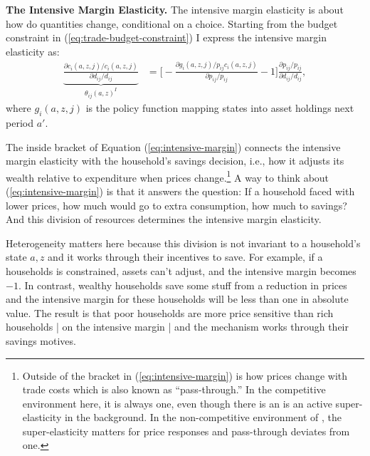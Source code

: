 \documentclass[12pt,pdftex]{article}
\begin{document}
\begin{onehalfspacing}
\textbf{The Intensive Margin Elasticity.} The intensive margin elasticity is about how do quantities change, conditional on a choice. Starting from the budget constraint in (\ref{eq:trade-budget-constraint}) I express the intensive margin elasticity as:
\begin{align}
\underbrace{\frac{\partial c_{i}(a,z,j)/ c_{i}(a,z,j)}{\partial d_{ij} / d_{ij}}}_{\theta_{ij}(a,z)^{I}} &= \bigg [-\frac{\partial g_{i}(a,z,j)/ p_{ij}c_{i}(a,z,j)}{\partial p_{ij}/ p_{ij}} - 1 \bigg ]\frac{\partial p_{ij}/p_{ij}}{\partial d_{ij}/ d_{ij}} ,
\label{eq:intensive-margin}
\end{align}
where $g_{i}(a,z,j)$ is the policy function mapping states into asset holdings next period $a'$.

The inside bracket of Equation (\ref{eq:intensive-margin}) connects the intensive margin elasticity with the household's savings decision, i.e., how it adjusts its wealth relative to expenditure when prices change.\footnote{Outside of the bracket in (\ref{eq:intensive-margin}) is how prices change with trade costs which is also known as ``pass-through.'' In the competitive environment here, it is always one, even though there is an is an active super-elasticity in the background. In the non-competitive environment of \citet{p-iq}, the super-elasticity matters for price responses and pass-through deviates from one.} A way to think about (\ref{eq:intensive-margin}) is that it answers the question: If a household faced with lower prices, how much would go to extra consumption, how much to savings? And this division of resources determines the intensive margin elasticity.

Heterogeneity matters here because this division is not invariant to a household's state $a, z$ and it works through their incentives to save. For example, if a households is constrained, assets can't adjust, and the intensive margin becomes $-1$. In contrast, wealthy households save some stuff from a reduction in prices and the intensive margin for these households will be less than one in absolute value. The result is that poor households are more price sensitive than rich households | on the intensive margin | and the mechanism works through their savings motives.


\end{onehalfspacing}
\end{document}
